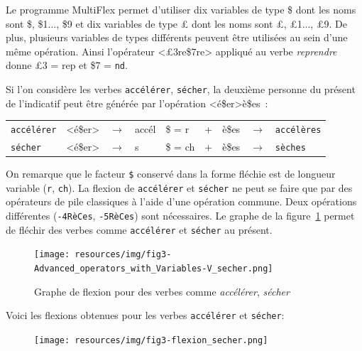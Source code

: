 \bigskip
\noindent
Le programme MultiFlex permet d'utiliser dix variables de type \$ dont les noms sont \$, \$1..., \$9
et dix variables de type {\pounds} dont les noms sont {\pounds}, {\pounds}1..., {\pounds}9. De plus,
plusieurs variables de types différents peuvent \^etre utilisées au sein d'une m\^eme opération.
Ainsi l'opérateur <{\pounds}3re\$7re> appliqué au verbe {\it reprendre} donne {\pounds}3 = 
 rep et \$7 = \verb+nd+.

\bigskip
\noindent
Si l'on considère les verbes \verb+accélérer+, \verb+sécher+, la
deuxième personne du présent de l'indicatif peut \^etre générée par l'opération <é\$er>è\$es~:

\begin{center}
\begin{tabular}{lllllllll}
	\verb+accélérer+ & <é\$er> & $\rightarrow$ & accél & \$ = r & + & è\$es &  $\rightarrow$ & \verb+accélères+\\
	\verb+sécher+ & <é\$er> & $\rightarrow$ & s & \$ = ch & + & è\$es & $\rightarrow$ & \verb+sèches+\\
\end{tabular}
\end{center}

\noindent
On remarque que le facteur \verb+$+ conservé dans la forme fléchie est de longueur variable (\verb+r+, \verb+ch+). 
La flexion de \verb+accélérer+ et \verb+sécher+ ne peut se faire que par des opérateurs de pile
classiques \`a l'aide d'une opération commune. Deux opérations différentes (\verb+-4RèCes+, \verb+-5RèCes+) sont
nécessaires. Le graphe de la figure~\ref{fig-inflection-secher} permet de fléchir des verbes comme
\verb+accélérer+ et \verb+sécher+ au présent.

\begin{figure}[!ht]
\begin{center}
\texttt{[image: resources/img/fig3-Advanced\_operators\_with\_Variables-V\_secher.png]}
\caption{Graphe de flexion pour des verbes comme {\it accélérer}, {\it sécher}
\label{fig-inflection-secher}}
\end{center}
\end{figure}

\newpage
\noindent
Voici les flexions obtenues pour les verbes \verb+accélérer+ et \verb+sécher+:

\begin{figure}[!ht]
\begin{center}
\texttt{[image: resources/img/fig3-flexion\_secher.png]}
\end{center}
\end{figure}

